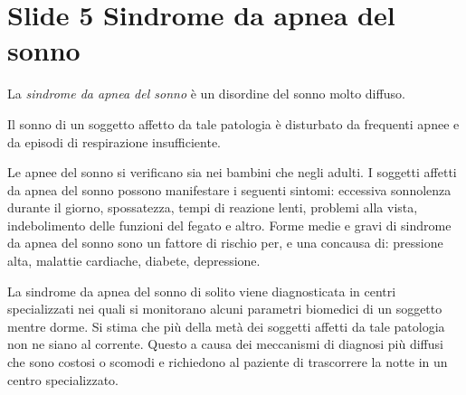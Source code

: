 
\section{Slide 5 Sindrome da apnea del sonno}
La \emph{sindrome da apnea del sonno} \`e un disordine del sonno molto diffuso.

Il sonno di un soggetto affetto da tale patologia \`e disturbato da frequenti apnee e da episodi di respirazione insufficiente. 


Le apnee del sonno si verificano sia nei bambini che negli adulti. 
I soggetti affetti da apnea del sonno possono manifestare i seguenti sintomi: eccessiva sonnolenza durante il giorno, spossatezza, tempi di reazione lenti, problemi alla vista, indebolimento delle funzioni del fegato e altro.
Forme medie e gravi di sindrome da apnea del sonno sono un fattore di rischio per, e una concausa di: pressione alta, malattie cardiache, diabete, depressione. 


La sindrome da apnea del sonno di solito viene diagnosticata in centri specializzati nei quali si monitorano alcuni parametri biomedici di un soggetto mentre dorme.
Si stima che pi\`u della met\`a dei soggetti affetti da tale patologia non ne siano al corrente. 
Questo a causa dei meccanismi di diagnosi pi\`u diffusi che sono costosi o scomodi e richiedono al paziente di trascorrere la notte in un centro specializzato.



